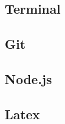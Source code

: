 \subsection{Terminal}
\subsection{Git}
\subsection{Node.js}
\subsection{Latex}

\subsection{}




\subsubsection{ }




